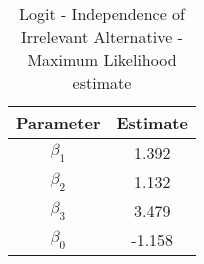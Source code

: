 \begin{table}[h!]
\centering
\caption{Logit - Independence of Irrelevant Alternative - Maximum Likelihood estimate}\label{tab:mvIIA}
\begin{tabular}{cc}
 \hline 
Parameter & Estimate \\ \hline 
$\beta_1$ & 1.392 \\ 
$\beta_2$ & 1.132 \\ 
$\beta_3$ & 3.479 \\ 
$\beta_0$ & -1.158 \\ 
\hline
\end{tabular}
\end{table}

